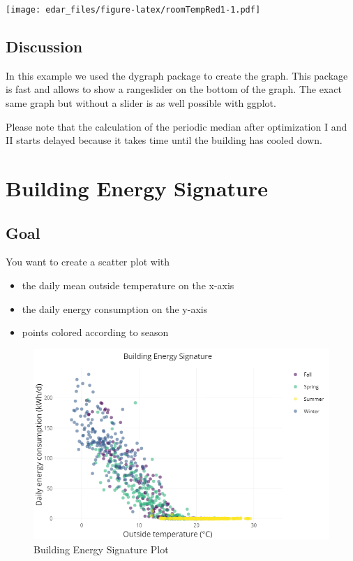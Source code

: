 \documentclass[
]{book}
\begin{document}
\texttt{[image: edar\_files/figure-latex/roomTempRed1-1.pdf]}

\hypertarget{discussion-7}{%
\subsection{Discussion}\label{discussion-7}}

In this example we used the dygraph package to create the graph. This package is fast and allows to show a rangeslider on the bottom of the graph. The exact same graph but without a slider is as well possible with ggplot.

Please note that the calculation of the periodic median after optimization I and II starts delayed because it takes time until the building has cooled down.

\hypertarget{building-energy-signature}{%
\section{Building Energy Signature}\label{building-energy-signature}}

\hypertarget{goal-16}{%
\subsection{Goal}\label{goal-16}}

You want to create a scatter plot with

\begin{itemize}
\item
  the daily mean outside temperature on the x-axis
\item
  the daily energy consumption on the y-axis
\item
  points colored according to season
\end{itemize}

\begin{figure}
\includegraphics[width=0.7\linewidth]{images/plotBldgEngySigScatter} \caption{Building Energy Signature Plot}\label{fig:unnamed-chunk-26}
\end{figure}
\end{document}

